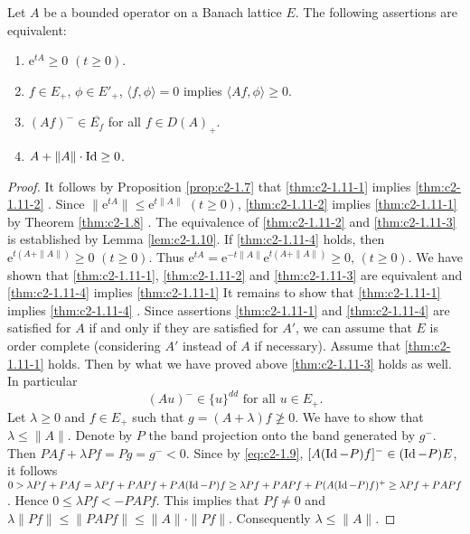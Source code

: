 \begin{theorem}\label{thm:c2-1.11}
Let $A$ be a bounded operator on a Banach lattice $E$.
The following assertions are equivalent:
\begin{enumerate}[\upshape (a)]
\item \label{thm:c2-1.11-1}
$\mathrm{e}^{tA} \geq 0$ $(t \geq 0)$.
\item \label{thm:c2-1.11-2}
$f \in E_{+}$, $\phi \in E'_{+}$, $\langle f,\phi \rangle = 0$ implies $\langle Af,\phi \rangle \geq 0$.
\item \label{thm:c2-1.11-3}
$(Af)^{-} \in \overline{E_{f}}$ for all $f \in D(A)_{+}$.
\item \label{thm:c2-1.11-4}
$A + \|A\| \cdot \operatorname{Id} \geq 0$.
\end{enumerate}
\end{theorem}
\begin{proof}
It follows by Proposition \ref{prop:c2-1.7}   that  \ref{thm:c2-1.11-1}   implies \ref{thm:c2-1.11-2}  .
Since $\|\mathrm{e}^{tA}\| \leq \mathrm{e}^{t\|A\|}$ $(t\geq0)$, \ref{thm:c2-1.11-2}   implies \ref{thm:c2-1.11-1}   by Theorem \ref{thm:c2-1.8}   .
The equivalence of \ref{thm:c2-1.11-2}   and \ref{thm:c2-1.11-3}   is established by Lemma \ref{lem:c2-1.10}.
If \ref{thm:c2-1.11-4} holds, then $\mathrm{e}^{t(A+\|A\|)} \geq 0$ $(t\geq0)$.
Thus $\mathrm{e}^{tA} = \mathrm{e}^{-t\|A\|} \mathrm{e}^{t(A+\|A\|)} \geq 0$, $(t\geq0)$.
We have shown that \ref{thm:c2-1.11-1}, \ref{thm:c2-1.11-2}  and \ref{thm:c2-1.11-3} are equivalent and \ref{thm:c2-1.11-4}  implies \ref{thm:c2-1.11-1} 
It remains to show that \ref{thm:c2-1.11-1}  implies \ref{thm:c2-1.11-4}  .
Since assertions \ref{thm:c2-1.11-1}   and \ref{thm:c2-1.11-4}   are satisfied for $A$ if and only if they are satisfied for $A'$, we can assume that $E$ is order complete (considering $A'$ instead of $A$ if necessary).
Assume that \ref{thm:c2-1.11-1}   holds.
Then by what we have proved above \ref{thm:c2-1.11-3}   holds as well.
In particular
\begin{equation}\label{eq:c2-1.9}
(Au)^{-} \in \{u\}^{dd} \text{ for all } u \in E_{+}.
\end{equation}
Let $\lambda \geq 0$ and $f \in E_{+}$ such that $g = (A + \lambda)f \not\geq 0$.
We have to show that $\lambda \leq \|A\|$.
Denote by $P$ the band projection onto the band generated by $g^{-}$.
Then $PAf + \lambda Pf = Pg = g^{-} < 0$.
Since by  \eqref{eq:c2-1.9}, $[A(\operatorname{Id} - P)f]^{-} \in (\operatorname{Id} - P)E$, it follows 
$0 > \lambda Pf + PAf = \lambda Pf + PAPf + PA(\operatorname{Id}-P)f \geq \lambda Pf + PAPf + P(A(\operatorname{Id}-P)f)^{+} \geq \lambda Pf + PAPf$.
Hence $0 \leq \lambda Pf < -PAPf$.
This implies that $Pf \neq 0$ and $\lambda\|Pf\| \leq \|PAPf\| \leq \|A\|\cdot\|Pf\|$.
Consequently $\lambda \leq \|A\|$.
\end{proof}
